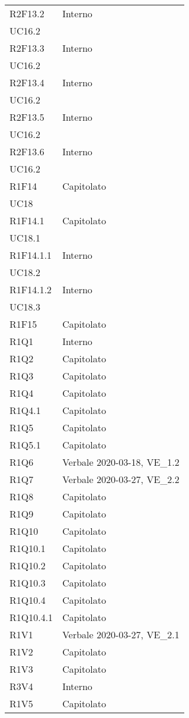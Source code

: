 \begin{longtable}{ 
		>{\centering}p{}
		>{\centering}p{}}
	R2F13.2	& Interno	\\ UC16.2 \tabularnewline
	R2F13.3	& Interno	\\ UC16.2 \tabularnewline
	R2F13.4	& Interno	\\ UC16.2 \tabularnewline
	R2F13.5	& Interno	\\ UC16.2 \tabularnewline
	R2F13.6	& Interno	\\ UC16.2 \tabularnewline
	R1F14	& Capitolato\\	UC18 \tabularnewline
	R1F14.1	& Capitolato\\	UC18.1 \tabularnewline
	R1F14.1.1 &	Interno	\\UC18.2 \tabularnewline
	R1F14.1.2 &	Interno	\\ UC18.3 \tabularnewline
	R1F15 &	Capitolato \tabularnewline 
	R1Q1 &	Interno	 \tabularnewline
	R1Q2 & 	Capitolato	 \tabularnewline
	R1Q3 & 	Capitolato \tabularnewline
	R1Q4 &	Capitolato \tabularnewline	
	R1Q4.1 &	Capitolato	\tabularnewline
	R1Q5 &	Capitolato	 \tabularnewline
	R1Q5.1 &	Capitolato	 \tabularnewline 
	R1Q6 &	Verbale 2020-03-18, VE\_1.2	\tabularnewline
	R1Q7 &	Verbale 2020-03-27, VE\_2.2	\tabularnewline
	R1Q8 & 	Capitolato	 \tabularnewline
	R1Q9 &	Capitolato	\tabularnewline
	R1Q10 &	Capitolato\tabularnewline
	R1Q10.1 & 	Capitolato\tabularnewline
	R1Q10.2	& Capitolato \tabularnewline
	R1Q10.3	& Capitolato \tabularnewline
	R1Q10.4	& Capitolato \tabularnewline
	R1Q10.4.1 &	Capitolato \tabularnewline
	R1V1 &	Verbale 2020-03-27, VE\_2.1 \tabularnewline
	R1V2 &	Capitolato \tabularnewline
	R1V3 &	Capitolato \tabularnewline
	R3V4 &	Interno \tabularnewline
	R1V5 &	Capitolato \tabularnewline

	
\end{longtable}	
